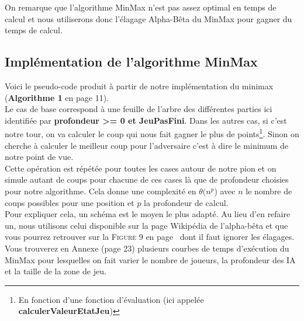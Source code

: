 \documentclass[11pt,a4paper]{article}
\begin{document}
On remarque que l'algorithme MinMax n'est pas assez optimal en temps de calcul et nous utiliserons donc l'élagage Alpha-Bêta du MinMax pour gagner du temps de calcul.\\

\subsection{Implémentation de l'algorithme MinMax}

\vspace{5px}

Voici le pseudo-code produit à partir de notre implémentation du minimax (\textbf{Algorithme 1} en page 11).\\

Le cas de base correspond à une feuille de l'arbre des différentes parties ici identifiée par \textbf{profondeur >= 0 et JeuPasFini}. Dans les autres cas, si c'est notre tour, on va calculer le coup qui nous fait gagner le plus de points\footnote{En fonction d'une fonction d'évaluation (ici appelée \textbf{calculerValeurEtatJeu})}. Sinon on cherche à calculer le meilleur coup pour l'adversaire c'est à dire le minimum de notre point de vue.\\

Cette opération est répétée pour toutes les cases autour de notre pion et on simule autant de coups pour chacune de ces cases là que de profondeur choisies pour notre algorithme. Cela donne une complexité en $\theta(n^p$) avec $n$ le nombre de coups possibles pour une position et $p$ la profondeur de calcul.\\

Pour expliquer cela, un schéma est le moyen le plus adapté. Au lieu d'en refaire un, nous utilisons celui disponible sur la page Wikipédia de l'alpha-bêta et que vous pourrez retrouver sur la \textsc{Figure} 9 en page~\pageref{fig:alphabeta} dont il faut ignorer les élagages. Vous trouverez en Annexe (page 23) plusieurs courbes de temps d'exécution du MinMax pour lesquelles on fait varier le nombre de joueurs, la profondeur des IA et la taille de la zone de jeu.

\newpage

\vspace{20px}
\end{document}

